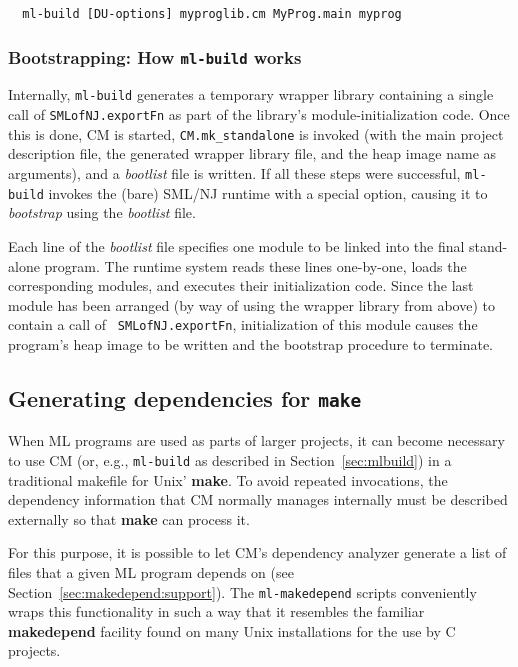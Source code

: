 \documentclass[titlepage,letterpaper]{article}
\begin{document}
\begin{verbatim}
  ml-build [DU-options] myproglib.cm MyProg.main myprog
\end{verbatim}

\subsubsection{Bootstrapping: How {\tt ml-build} works}

Internally, {\tt ml-build} generates a temporary wrapper library
containing a single call of {\tt SMLofNJ.exportFn} as part of the
library's module-initialization code.  Once this is done, CM is
started, {\tt CM.mk\_standalone} is invoked (with the main project
description file, the generated wrapper library file, and the heap
image name as arguments), and a {\em bootlist} file is written.
If all these steps were successful, {\tt ml-build} invokes the (bare)
SML/NJ runtime with a special option, causing it to {\em bootstrap}
using the {\em bootlist} file.

Each line of the {\em bootlist} file specifies one module to be linked
into the final stand-alone program.  The runtime system reads these
lines one-by-one, loads the corresponding modules, and executes their
initialization code.  Since the last module has been arranged (by way
of using the wrapper library from above) to contain a call of {\tt
SMLofNJ.exportFn}, initialization of this module causes the program's
heap image to be written and the bootstrap procedure to terminate.

\subsection{Generating dependencies for {\tt make}}
\label{sec:makedepend}

When ML programs are used as parts of larger projects, it can become
necessary to use CM (or, e.g., {\tt ml-build} as described in
Section~\ref{sec:mlbuild}) in a traditional makefile for Unix' {\bf
make}.  To avoid repeated invocations, the dependency information that
CM normally manages internally must be described externally so that
{\bf make} can process it.

For this purpose, it is possible to let CM's dependency analyzer
generate a list of files that a given ML program depends on (see
Section~\ref{sec:makedepend:support}).  The {\tt ml-makedepend}
scripts conveniently wraps this functionality in such a way that it
resembles the familiar {\bf makedepend} facility found on many Unix
installations for the use by C projects.
\end{document}
